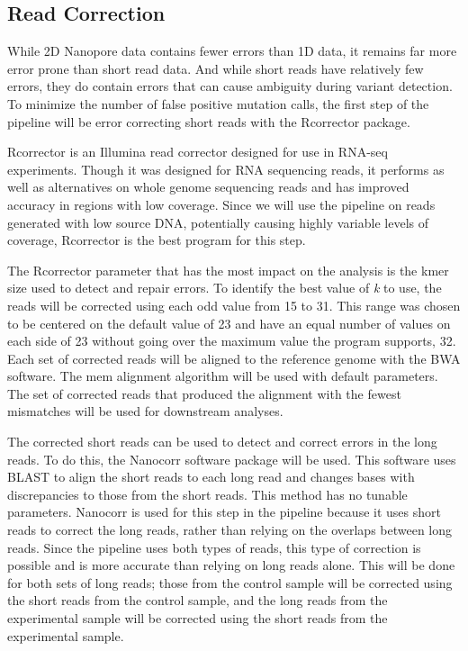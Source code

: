 \subsection{Read Correction}
While 2D Nanopore data contains fewer errors than 1D data, it remains far more error prone than short read data.
And while short reads have relatively few errors, they do contain errors that can cause ambiguity during variant detection.
To minimize the number of false positive mutation calls, the first step of the pipeline will be error correcting short reads with the Rcorrector package.

Rcorrector is an Illumina read corrector designed for use in RNA-seq experiments. Though it was designed for RNA sequencing reads, it performs as well as alternatives on whole genome sequencing reads and has improved accuracy in regions with low coverage. Since we will use the pipeline on reads generated with low source DNA, potentially causing highly variable levels of coverage, Rcorrector is the best program for this step.

The Rcorrector parameter that has the most impact on the analysis is the kmer size used to detect and repair errors. To identify the best value of \textit{k} to use, the reads will be corrected using each odd value from 15 to 31. This range was chosen to be centered on the default value of 23 and have an equal number of values on each side of 23 without going over the maximum value the program supports, 32. Each set of corrected reads will be aligned to the reference genome with the BWA software. The mem alignment algorithm will be used with default parameters. The set of corrected reads that produced the alignment with the fewest mismatches will be used for downstream analyses.

The corrected short reads can be used to detect and correct errors in the long reads. To do this, the Nanocorr software package will be used. This software uses BLAST to align the short reads to each long read and changes bases with discrepancies to those from the short reads. This method has no tunable parameters. Nanocorr is used for this step in the pipeline because it uses short reads to correct the long reads, rather than relying on the overlaps between long reads. Since the pipeline uses both types of reads, this type of correction is possible and is more accurate than relying on long reads alone. This will be done for both sets of long reads; those from the control sample will be corrected using the short reads from the control sample, and the long reads from the experimental sample will be corrected using the short reads from the experimental sample.

